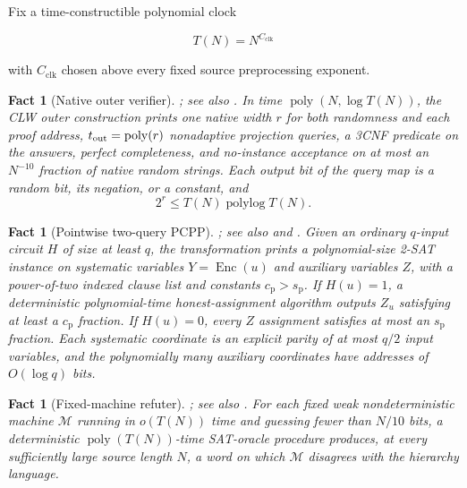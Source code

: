 \documentclass[11pt,letterpaper]{article}
\newtheorem{fact}[theorem]{Fact}
\theoremstyle{definition}
\theoremstyle{remark}
\begin{document}
Fix a time-constructible polynomial clock

\[
T(N)=N^{C_{\mathrm{clk}}}
\]

with \(C_{\mathrm{clk}}\) chosen above every fixed source preprocessing exponent.

\begin{fact}[Native outer verifier]
\label{fact:outer-verifier}
\cite[Lemma 3.10]{CLW20}; see also \cite{BV14}. In time
\(\operatorname{poly}(N,\log T(N))\), the CLW outer
construction prints one native width \(r\) for both randomness and each
proof address, \(t_{\rm out}=\operatorname{poly}(r)\) nonadaptive
projection
queries, a 3CNF predicate on the answers, perfect completeness, and
no-instance acceptance on at most an \(N^{-10}\) fraction of native
random strings. Each output bit of the query map is a random bit, its
negation, or a constant, and \[
2^r
\le
T(N)\operatorname{polylog}T(N).
\]
\end{fact}

\begin{fact}[Pointwise two-query PCPP]
\label{fact:pcpp}
\cite[Lemma 3.11]{CLW20}; see also \cite[Lemmas 25--27]{CW19} and
\cite{VW20}. Given an ordinary
\(q\)-input circuit \(H\)
of size at least \(q\), the transformation prints a polynomial-size
2-SAT instance on systematic variables \(Y=\operatorname{Enc}(u)\) and
auxiliary variables \(Z\), with a power-of-two indexed clause list and
constants \(c_{\mathrm p}>s_{\mathrm p}\). If \(H(u)=1\), a
deterministic polynomial-time honest-assignment algorithm outputs
\(Z_u\) satisfying at least a \(c_{\mathrm p}\) fraction. If \(H(u)=0\),
every \(Z\) assignment satisfies at most an \(s_{\mathrm p}\) fraction.
Each systematic coordinate is an explicit parity of at most \(q/2\)
input variables, and the polynomially many auxiliary coordinates have
addresses of \(O(\log q)\) bits.
\end{fact}

\begin{fact}[Fixed-machine refuter]
\label{fact:refuter}
\cite[Theorem 4.6]{CLW20}; see also \cite{FS16}. For each fixed weak
nondeterministic machine \(\mathcal M\) running
in \(o(T(N))\) time and guessing fewer than \(N/10\) bits, a
deterministic \(\operatorname{poly}(T(N))\)-time SAT-oracle procedure
produces, at every sufficiently large source length \(N\), a word on
which \(\mathcal M\) disagrees with the hierarchy language.
\end{fact}
\end{document}
